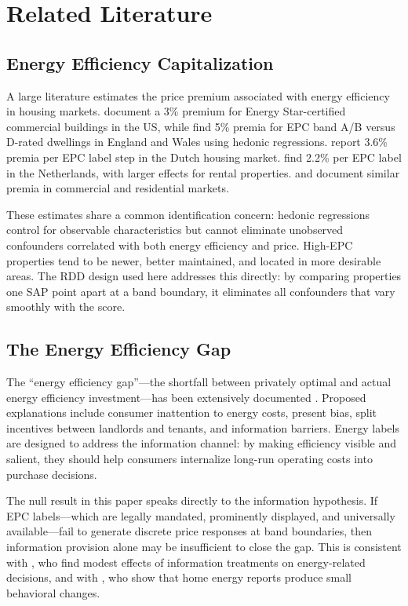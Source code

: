 \documentclass[12pt]{article}
\begin{document}
\section{Related Literature}\label{sec:literature}

\subsection{Energy Efficiency Capitalization}

A large literature estimates the price premium associated with energy efficiency in housing markets. \citet{eichholtz2010doing} document a 3\% premium for Energy Star-certified commercial buildings in the US, while \citet{fuerst2015does} find 5\% premia for EPC band A/B versus D-rated dwellings in England and Wales using hedonic regressions. \citet{brounen2011residential} report 3.6\% premia per EPC label step in the Dutch housing market. \citet{aydin2020capitalization} find 2.2\% per EPC label in the Netherlands, with larger effects for rental properties. \citet{chegut2016energy} and \citet{kahn2005greenness} document similar premia in commercial and residential markets.

These estimates share a common identification concern: hedonic regressions control for observable characteristics but cannot eliminate unobserved confounders correlated with both energy efficiency and price. High-EPC properties tend to be newer, better maintained, and located in more desirable areas. The RDD design used here addresses this directly: by comparing properties one SAP point apart at a band boundary, it eliminates all confounders that vary smoothly with the score.

\subsection{The Energy Efficiency Gap}

The ``energy efficiency gap''---the shortfall between privately optimal and actual energy efficiency investment---has been extensively documented \citep{allcott2014consumers, gerarden2017assessing, gillingham2021energy}. Proposed explanations include consumer inattention to energy costs, present bias, split incentives between landlords and tenants, and information barriers. Energy labels are designed to address the information channel: by making efficiency visible and salient, they should help consumers internalize long-run operating costs into purchase decisions.

The null result in this paper speaks directly to the information hypothesis. If EPC labels---which are legally mandated, prominently displayed, and universally available---fail to generate discrete price responses at band boundaries, then information provision alone may be insufficient to close the gap. This is consistent with \citet{allcott2014consumers}, who find modest effects of information treatments on energy-related decisions, and with \citet{davis2014energy}, who show that home energy reports produce small behavioral changes.
\end{document}

